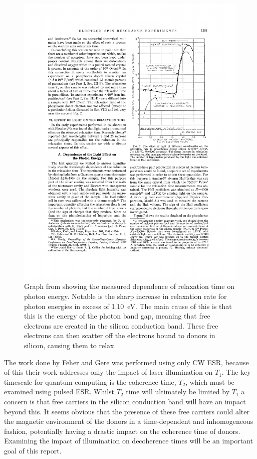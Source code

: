 \begin{figure}
\centering
\includegraphics[width = 0.75\columnwidth]{Figures/photEngDep.pdf}
\caption[$T_1$ dependence on photon energy]{Graph from \cite{Gere1959} showing the measured dependence of relaxation time on photon energy. Notable is the sharp increase in relaxation rate for photon energies in excess of 1.10~eV. The main cause of this is that this is the energy of the photon band gap, meaning that free electrons are created in the silicon conduction band. These free electrons can then scatter off the electrons bound to donors in silicon, causing them to relax.}
\label{fig:phosPhotFeher}
\end{figure}

The work done by Feher and Gere was performed using only CW ESR, because of this their work addresses only the impact of laser illumination on $T_1$.
The key timescale for quantum computing is the coherence time, $T_2$, which must be examined using pulsed ESR.
Whilst $T_2$ time will ultimately be limited by $T_1$ a concern is that free carriers in the silicon conduction band will have an impact beyond this.
It seems obvious that the presence of these free carriers could alter the magnetic environment of the donors in a time-dependent and inhomogeneous fashion, potentially having a drastic impact on the coherence time of donors.
Examining the impact of illumination on decoherence times will be an important goal of this report.

